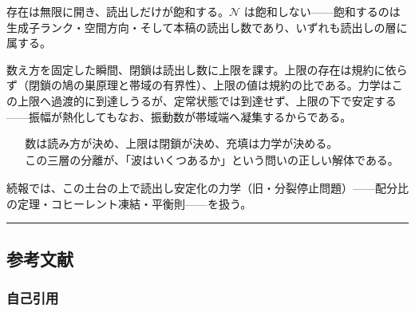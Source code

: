 \documentclass[
  a4paper,
]{ltjsarticle}
\begin{document}
存在は無限に開き、読出しだけが飽和する。\(\mathcal N\)
は飽和しない------飽和するのは生成子ランク・空間方向・そして本稿の読出し数であり、いずれも読出しの層に属する。

数え方を固定した瞬間、閉鎖は読出し数に上限を課す。上限の存在は規約に依らず（閉鎖の鳩の巣原理と帯域の有界性）、上限の値は規約の比である。力学はこの上限へ過渡的に到達しうるが、定常状態では到達せず、上限の下で安定する------振幅が熱化してもなお、振動数が帯域端へ凝集するからである。

\[
\boxed{
\begin{aligned}
&\text{数は読み方が決め、上限は閉鎖が決め、充填は力学が決める。}\\
&\text{この三層の分離が、「波はいくつあるか」という問いの正しい解体である。}
\end{aligned}
}
\]

続報では、この土台の上で読出し安定化の力学（旧・分裂停止問題）------配分比の定理・コヒーレント凍結・平衡則------を扱う。

\begin{center}\rule{0.5\linewidth}{0.5pt}\end{center}

\subsection{参考文献}\label{ux53c2ux8003ux6587ux732e}

\subsubsection{自己引用}\label{ux81eaux5df1ux5f15ux7528}
\end{document}
